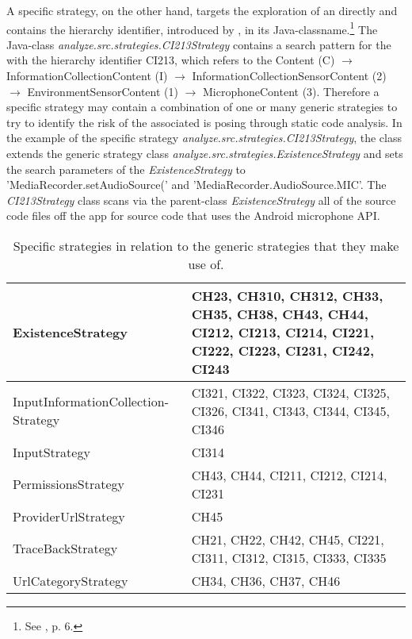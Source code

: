 A specific strategy, on the other hand, targets the exploration of an \ipp directly and contains the \ipp hierarchy identifier, introduced by \textcite{Dehling2016}, in its Java-classname.\footnote{See \cite{Dehling2016}, p. 6.}
The Java-class \textit{analyze.src.strategies.CI213\textunderscore Strategy} contains a search pattern for the \ipp with the hierarchy identifier CI213, which refers to the \ipp Content (C) $\rightarrow$ InformationCollectionContent (I) $\rightarrow$ InformationCollectionSensorContent (2) $\rightarrow$ EnvironmentSensorContent (1) $\rightarrow$ MicrophoneContent (3).
Therefore a specific strategy may contain a combination of one or many generic strategies to try to identify the risk of the associated \ipp is posing through static code analysis.
In the example of the specific strategy \textit{analyze.src.strategies.CI213\textunderscore Strategy}, the class extends the generic strategy class \textit{analyze.src.strategies.ExistenceStrategy} and sets the search parameters of the \textit{ExistenceStrategy} to 'MediaRecorder.setAudioSource(' and 'MediaRecorder.AudioSource.MIC'.
The \textit{CI213\textunderscore Strategy} class scans via the parent-class \textit{ExistenceStrategy} all of the source code files off the app for source code that uses the Android microphone \acs{API}.

\begin{table}
	\begin{center}

	\begin{tabular}{ | p{4.8cm} | p{9cm} | }
	\hline
		ExistenceStrategy & CH23, CH310, CH312, CH33, CH35, CH38, CH43, CH44, CI212, CI213, CI214, CI221, CI222, CI223, CI231, CI242, CI243 \\ \hline
		InputInformationCollection-Strategy & CI321, CI322, CI323, CI324, CI325, CI326, CI341, CI343, CI344, CI345, CI346 \\ \hline
		InputStrategy & CI314 \\ \hline
		PermissionsStrategy & CH43, CH44, CI211, CI212, CI214, CI231 \\ \hline
		ProviderUrlStrategy & CH45 \\ \hline
		TraceBackStrategy & CH21, CH22, CH42, CH45, CI221, CI311, CI312, CI315, CI333, CI335 \\ \hline
		UrlCategoryStrategy & CH34, CH36, CH37, CH46 \\ \hline
	\end{tabular}
	\end{center}
	
	\caption{Specific strategies in relation to the generic strategies that they make use of.} 
	\label{table:specStrategies}
\end{table}


